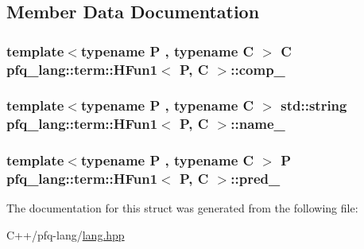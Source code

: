 \subsection{Member Data Documentation}
\hypertarget{structpfq__lang_1_1term_1_1HFun1_a16b8c06ef73b339272e21dbfd5be962c}{
\subsubsection[{comp\-\_\-}]{\setlength{\rightskip}{0pt plus 5cm}template$<$typename P , typename C $>$ C {\bf pfq\-\_\-lang\-::term\-::\-H\-Fun1}$<$ P, C $>$\-::comp\-\_\-}}\label{structpfq__lang_1_1term_1_1HFun1_a16b8c06ef73b339272e21dbfd5be962c}
\hypertarget{structpfq__lang_1_1term_1_1HFun1_ac37e99de5e6350b504a03f0e03d725c4}{
\subsubsection[{name\-\_\-}]{\setlength{\rightskip}{0pt plus 5cm}template$<$typename P , typename C $>$ std\-::string {\bf pfq\-\_\-lang\-::term\-::\-H\-Fun1}$<$ P, C $>$\-::name\-\_\-}}\label{structpfq__lang_1_1term_1_1HFun1_ac37e99de5e6350b504a03f0e03d725c4}
\hypertarget{structpfq__lang_1_1term_1_1HFun1_ac15b6e2665e60ad7f1700797c7677ea6}{
\subsubsection[{pred\-\_\-}]{\setlength{\rightskip}{0pt plus 5cm}template$<$typename P , typename C $>$ P {\bf pfq\-\_\-lang\-::term\-::\-H\-Fun1}$<$ P, C $>$\-::pred\-\_\-}}\label{structpfq__lang_1_1term_1_1HFun1_ac15b6e2665e60ad7f1700797c7677ea6}


The documentation for this struct was generated from the following file\-:\begin{DoxyCompactItemize}
\item 
C++/pfq-\/lang/\hyperlink{lang_8hpp}{lang.\-hpp}\end{DoxyCompactItemize}
